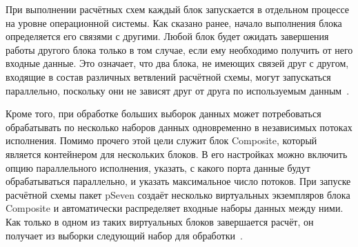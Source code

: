 При выполнении расчётных схем каждый блок запускается в отдельном процессе на уровне операционной системы. Как сказано ранее, начало выполнения блока определяется его связями с другими. Любой блок будет ожидать завершения работы другого блока только в том случае, если ему необходимо получить от него входные данные. Это означает, что два блока, не имеющих связей друг с другом, входящие в состав различных ветвлений расчётной схемы, могут запускаться параллельно, поскольку они не зависят друг от друга по используемым данным~\cite{pSevenDocsWorkflow2021}.

Кроме того, при обработке больших выборок данных может потребоваться обрабатывать по несколько наборов данных одновременно в независимых потоках исполнения. Помимо прочего этой цели служит блок \textsf{Composite}, который является контейнером для нескольких блоков. В его настройках можно включить опцию параллельного исполнения, указать, с какого порта данные будут обрабатываться параллельно, и указать максимальное число потоков. При запуске расчётной схемы пакет \textsf{pSeven} создаёт несколько виртуальных экземпляров блока \textsf{Composite} и автоматически распределяет входные наборы данных между ними. Как только в одном из таких виртуальных блоков завершается расчёт, он получает из выборки следующий набор для обработки~\cite{pSevenDocsParallel2021}.

\noteattributes{}
